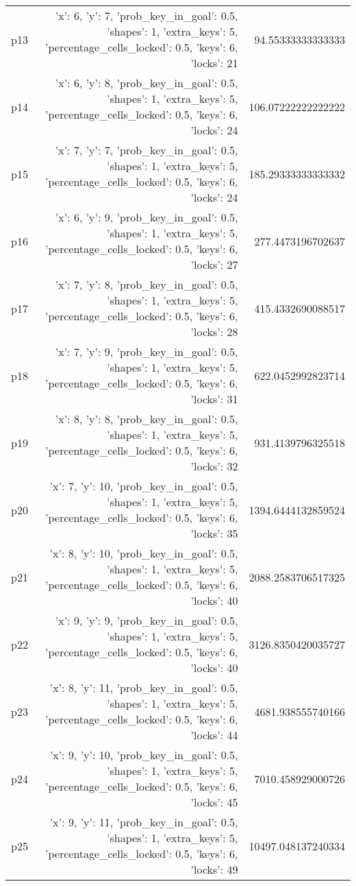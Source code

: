 \documentclass{article}
\begin{document}
\begin{center}
\begin{tabular}{r|r|r}
  p13&{'x': 6, 'y': 7, 'prob\_key\_in\_goal': 0.5, 'shapes': 1, 'extra\_keys': 5, 'percentage\_cells\_locked': 0.5, 'keys': 6, 'locks': 21}&94.55333333333333\\
  p14&{'x': 6, 'y': 8, 'prob\_key\_in\_goal': 0.5, 'shapes': 1, 'extra\_keys': 5, 'percentage\_cells\_locked': 0.5, 'keys': 6, 'locks': 24}&106.07222222222222\\
  p15&{'x': 7, 'y': 7, 'prob\_key\_in\_goal': 0.5, 'shapes': 1, 'extra\_keys': 5, 'percentage\_cells\_locked': 0.5, 'keys': 6, 'locks': 24}&185.29333333333332\\
  p16&{'x': 6, 'y': 9, 'prob\_key\_in\_goal': 0.5, 'shapes': 1, 'extra\_keys': 5, 'percentage\_cells\_locked': 0.5, 'keys': 6, 'locks': 27}&277.4473196702637\\
  p17&{'x': 7, 'y': 8, 'prob\_key\_in\_goal': 0.5, 'shapes': 1, 'extra\_keys': 5, 'percentage\_cells\_locked': 0.5, 'keys': 6, 'locks': 28}&415.4332690088517\\
  p18&{'x': 7, 'y': 9, 'prob\_key\_in\_goal': 0.5, 'shapes': 1, 'extra\_keys': 5, 'percentage\_cells\_locked': 0.5, 'keys': 6, 'locks': 31}&622.0452992823714\\
  p19&{'x': 8, 'y': 8, 'prob\_key\_in\_goal': 0.5, 'shapes': 1, 'extra\_keys': 5, 'percentage\_cells\_locked': 0.5, 'keys': 6, 'locks': 32}&931.4139796325518\\
  p20&{'x': 7, 'y': 10, 'prob\_key\_in\_goal': 0.5, 'shapes': 1, 'extra\_keys': 5, 'percentage\_cells\_locked': 0.5, 'keys': 6, 'locks': 35}&1394.6444132859524\\
  p21&{'x': 8, 'y': 10, 'prob\_key\_in\_goal': 0.5, 'shapes': 1, 'extra\_keys': 5, 'percentage\_cells\_locked': 0.5, 'keys': 6, 'locks': 40}&2088.2583706517325\\
  p22&{'x': 9, 'y': 9, 'prob\_key\_in\_goal': 0.5, 'shapes': 1, 'extra\_keys': 5, 'percentage\_cells\_locked': 0.5, 'keys': 6, 'locks': 40}&3126.8350420035727\\
  p23&{'x': 8, 'y': 11, 'prob\_key\_in\_goal': 0.5, 'shapes': 1, 'extra\_keys': 5, 'percentage\_cells\_locked': 0.5, 'keys': 6, 'locks': 44}&4681.938555740166\\
  p24&{'x': 9, 'y': 10, 'prob\_key\_in\_goal': 0.5, 'shapes': 1, 'extra\_keys': 5, 'percentage\_cells\_locked': 0.5, 'keys': 6, 'locks': 45}&7010.458929000726\\
  p25&{'x': 9, 'y': 11, 'prob\_key\_in\_goal': 0.5, 'shapes': 1, 'extra\_keys': 5, 'percentage\_cells\_locked': 0.5, 'keys': 6, 'locks': 49}&10497.048137240334\\

\end{tabular}
\end{center}
\end{document}
